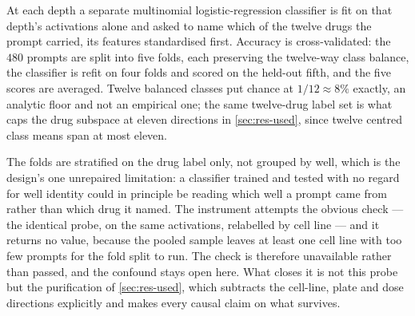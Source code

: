 At each depth a separate multinomial logistic-regression classifier is fit on
that depth's activations alone and asked to name which of the twelve drugs the
prompt carried, its features standardised first. Accuracy is cross-validated:
the $480$ prompts are split into five folds, each preserving the twelve-way
class balance, the classifier is refit on four folds and scored on the held-out
fifth, and the five scores are averaged. Twelve balanced classes put chance at
$1/12 \approx 8\%$ exactly, an analytic floor and not an empirical one; the same twelve-drug label set is what caps the drug subspace at eleven directions in \cref{sec:res-used}, since twelve centred class means span at most eleven.

The folds are stratified on the drug label only, not grouped by well, which is
the design's one unrepaired limitation: a classifier trained and tested with no
regard for well identity could in principle be reading which well a prompt came
from rather than which drug it named. The instrument attempts the obvious check
--- the identical probe, on the same activations, relabelled by cell line ---
and it returns no value, because the pooled sample leaves at least one cell
line with too few prompts for the fold split to run. The check is therefore
unavailable rather than passed, and the confound stays open here. What closes
it is not this probe but the purification of \cref{sec:res-used}, which
subtracts the cell-line, plate and dose directions explicitly and makes every
causal claim on what survives.

